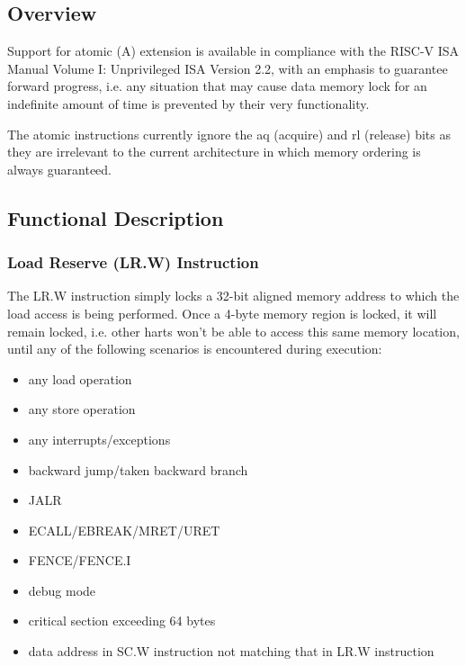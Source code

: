 \documentclass[main\_\_EN.tex]{subfiles}
\begin{document}
\subsection{Overview}
\label{sec:riscvcpu-atomic-overview}

Support for atomic (A) extension is available in compliance with the RISC-V ISA Manual Volume I: Unprivileged ISA Version 2.2, with an emphasis to guarantee forward progress, i.e. any situation that may cause data memory lock for an indefinite amount of time is prevented by their very functionality.

The atomic instructions currently ignore the aq (acquire) and rl (release) bits as they are irrelevant to the current architecture in which memory ordering is always guaranteed.

\subsection{Functional Description}
\label{sec:riscvcpu-atomic-func-descr}

\subsubsection{Load Reserve (LR.W) Instruction}
\label{sec:riscvcpu-atomic-lr}

The LR.W instruction simply locks a 32-bit aligned memory address to which the load access is being performed. Once a 4-byte memory region is locked, it will remain locked, i.e. other harts won't be able to access this same memory location, until any of the following scenarios is encountered during execution:

\begin{itemize}
    \item any load operation
    \item any store operation
    \item any interrupts/exceptions
    \item backward jump/taken backward branch
    \item JALR
    \item ECALL/EBREAK/MRET/URET
    \item FENCE/FENCE.I
    \item debug mode
    \item critical section exceeding 64 bytes
    \item data address in SC.W instruction not matching that in LR.W instruction
\end{itemize}
\end{document}
